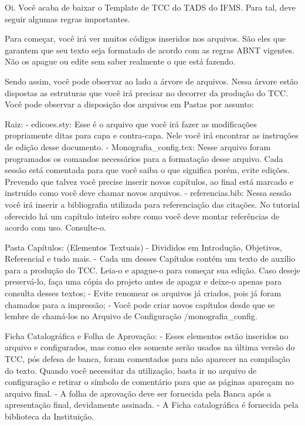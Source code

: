 Oi.
Você acaba de baixar o Template de TCC do TADS do IFMS.
Para tal, deve seguir algumas regras importantes.

Para começar, você irá ver muitos códigos inseridos nos arquivos. São eles que garantem que seu texto seja formatado de acordo com as regras ABNT vigentes. Não os apague ou edite sem saber realmente o que está fazendo.

Sendo assim, você pode observar ao lado a árvore de arquivos. Nessa árvore estão dispostas as estruturas que você irá precisar no decorrer da produção do TCC. Você pode observar a disposição dos arquivos em Pastas por assunto:

Raiz: 
- edicoes.sty: Esse é o arquivo que você irá fazer as modificações propriamente ditas para capa e contra-capa. Nele você irá encontrar as instruções de edição desse documento.
- Monografia\_config.tex: Nesse arquivo foram programados os comandos necessários para a formatação desse arquivo. Cada sessão está comentada para que você saiba o que significa porém, evite edições. Prevendo que talvez você precise inserir novos capítulos, ao final está marcado e instruído como você deve chamar novos arquivos.  
- referencias.bib: Nessa sessão você irá inserir a bibliografia utilizada para referenciação das citações. No tutorial oferecido há um capítulo inteiro sobre como você deve montar referências de acordo com uso. Consulte-o.

Pasta Capítulos: (Elementos Textuais)
- Divididos em Introdução, Objetivos, Referencial e tudo mais.
- Cada um desses Capítulos contém um texto de auxílio para a produção do TCC. Leia-o e apague-o para começar sua edição. Caso deseje preservá-lo, faça uma cópia do projeto antes de apagar e deixe-o apenas para consulta desses textos;
- Evite renomear os arquivos já criados, pois já foram chamados para a impressão;
- Você pode criar novos capítulos desde que se lembre de chamá-los no Arquivo de Configuração /monografia\_config.

Ficha Catalográfica e Folha de Aprovação: 
- Esses elementos estão inseridos no arquivo e configurados, mas como eles somente serão usados na última versão do TCC, pós defesa de banca, foram comentados para não aparecer na compilação do texto. Quando você necessitar da utilização, basta ir no arquivo de configuração e retirar o símbolo de comentário para que as páginas apareçam no arquivo final.
- A folha de aprovação deve ser fornecida pela Banca após a apresentação final, devidamente assinada.
- A Ficha catalográfica é fornecida pela biblioteca da Instituição.

